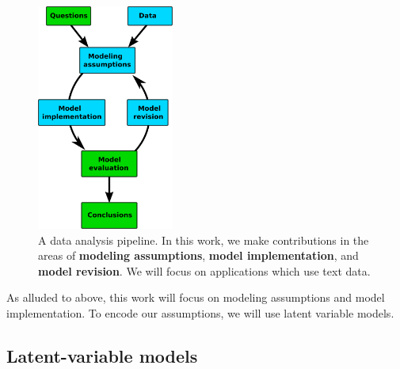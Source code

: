 \begin{figure}
  \center \includegraphics[width=0.4\textwidth]{chapter_introductory_material/figs/model_pipeline.pdf}
  \caption{A data analysis pipeline.  In this work, we make
    contributions in the areas of \textbf{modeling assumptions},
    \textbf{model implementation}, and \textbf{model revision}.  We
    will focus on applications which use text data.}
  \label{fig:data_analysis_pipeline}
\end{figure}

As alluded to above, this work will focus on modeling assumptions and
model implementation.  To encode our assumptions, we will use latent
variable models.

\subsection{Latent-variable models}

